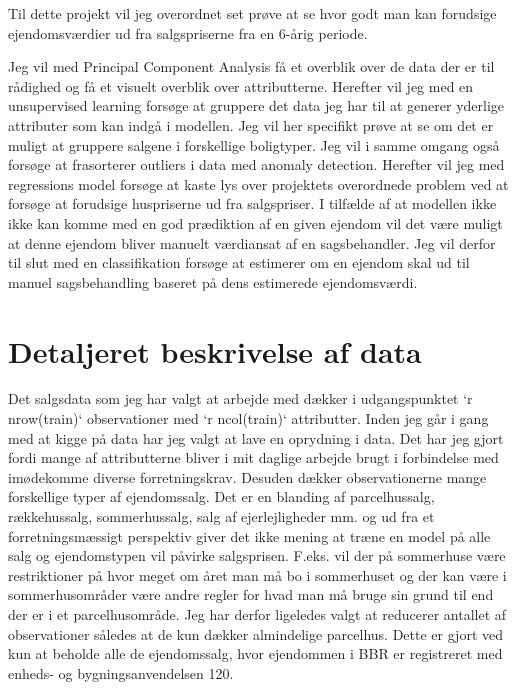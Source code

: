 \documentclass{report}
\begin{document}
Til dette projekt vil jeg overordnet set prøve at se hvor godt man kan forudsige ejendomsværdier ud fra salgspriserne fra en 6-årig periode. 

Jeg vil med Principal Component Analysis få et overblik over de data der er til rådighed og få et visuelt overblik over attributterne. 
Herefter vil jeg med en unsupervised learning forsøge at gruppere det data jeg har til at generer yderlige attributer som kan indgå i modellen. Jeg vil her specifikt prøve at se om det er muligt at gruppere salgene i forskellige boligtyper. Jeg vil i samme omgang også forsøge at frasorterer outliers i data med anomaly detection. 
Herefter vil jeg med regressions model forsøge at kaste lys over projektets overordnede problem ved at forsøge at forudsige huspriserne ud fra salgspriser. I tilfælde af at modellen ikke ikke kan komme med en god prædiktion af en given ejendom vil det være muligt at denne ejendom bliver manuelt værdiansat af en sagsbehandler. Jeg vil derfor til slut med en classifikation forsøge at estimerer om en ejendom skal ud til manuel sagsbehandling baseret på dens estimerede ejendomsværdi.


\section{Detaljeret beskrivelse af data}



Det salgsdata som jeg har valgt at arbejde med dækker i udgangspunktet `r nrow(train)` observationer med `r ncol(train)` attributter. Inden jeg går i gang med at kigge på data har jeg valgt at lave en oprydning i data. Det har jeg gjort fordi mange af attributterne bliver i mit daglige arbejde brugt i forbindelse med imødekomme diverse forretningskrav. Desuden dækker observationerne mange forskellige typer af ejendomssalg. Det er en blanding af parcelhussalg, rækkehussalg, sommerhussalg, salg af ejerlejligheder mm. og ud fra et forretningsmæssigt perspektiv giver det ikke mening at træne en model på alle salg og ejendomstypen vil påvirke salgsprisen. F.eks. vil der på sommerhuse være restriktioner på hvor meget om året man må bo i sommerhuset og der kan være i sommerhusområder være andre regler for hvad man må bruge sin grund til end der er i et parcelhusområde. Jeg har derfor ligeledes valgt at reducerer antallet af observationer således at de kun dækker almindelige parcelhus. Dette er gjort ved kun at beholde alle de ejendomssalg, hvor ejendommen i BBR er registreret med enheds- og bygningsanvendelsen 120. 
\end{document}

